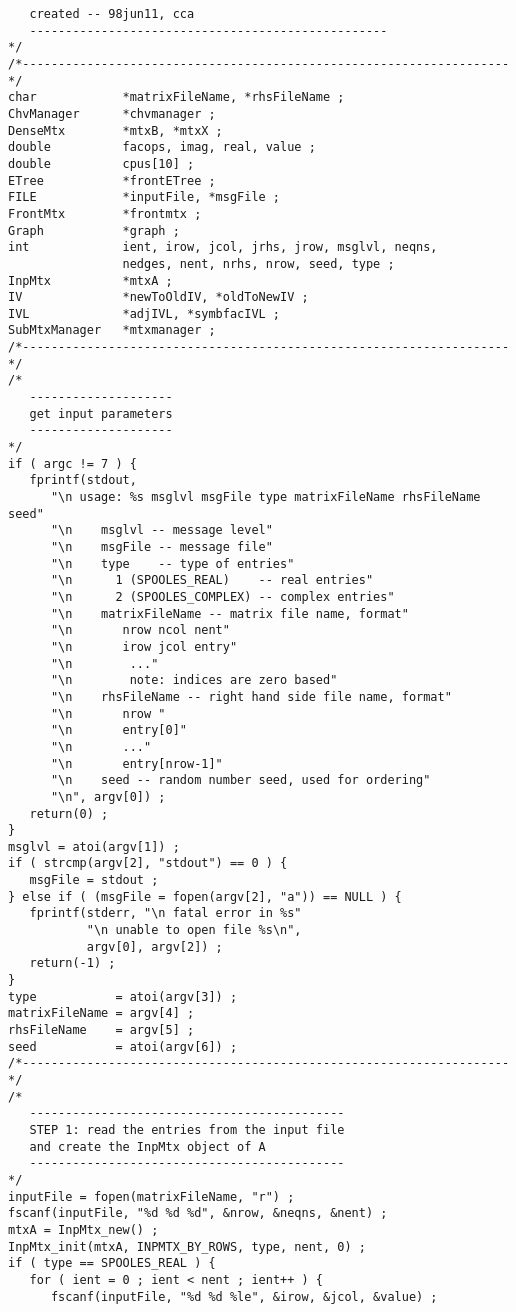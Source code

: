 \begin{verbatim}
   created -- 98jun11, cca
   --------------------------------------------------
*/
/*--------------------------------------------------------------------*/
char            *matrixFileName, *rhsFileName ;
ChvManager      *chvmanager ;
DenseMtx        *mtxB, *mtxX ;
double          facops, imag, real, value ;
double          cpus[10] ;
ETree           *frontETree ;
FILE            *inputFile, *msgFile ;
FrontMtx        *frontmtx ;
Graph           *graph ;
int             ient, irow, jcol, jrhs, jrow, msglvl, neqns,
                nedges, nent, nrhs, nrow, seed, type ;
InpMtx          *mtxA ;
IV              *newToOldIV, *oldToNewIV ;
IVL             *adjIVL, *symbfacIVL ;
SubMtxManager   *mtxmanager ;
/*--------------------------------------------------------------------*/
/*
   --------------------
   get input parameters
   --------------------
*/
if ( argc != 7 ) {
   fprintf(stdout, 
      "\n usage: %s msglvl msgFile type matrixFileName rhsFileName seed"
      "\n    msglvl -- message level"
      "\n    msgFile -- message file"
      "\n    type    -- type of entries"
      "\n      1 (SPOOLES_REAL)    -- real entries"
      "\n      2 (SPOOLES_COMPLEX) -- complex entries"
      "\n    matrixFileName -- matrix file name, format"
      "\n       nrow ncol nent"
      "\n       irow jcol entry"
      "\n        ..."
      "\n        note: indices are zero based"
      "\n    rhsFileName -- right hand side file name, format"
      "\n       nrow "
      "\n       entry[0]"
      "\n       ..."
      "\n       entry[nrow-1]"
      "\n    seed -- random number seed, used for ordering"
      "\n", argv[0]) ;
   return(0) ;
}
msglvl = atoi(argv[1]) ;
if ( strcmp(argv[2], "stdout") == 0 ) {
   msgFile = stdout ;
} else if ( (msgFile = fopen(argv[2], "a")) == NULL ) {
   fprintf(stderr, "\n fatal error in %s"
           "\n unable to open file %s\n",
           argv[0], argv[2]) ;
   return(-1) ;
}
type           = atoi(argv[3]) ;
matrixFileName = argv[4] ;
rhsFileName    = argv[5] ;
seed           = atoi(argv[6]) ;
/*--------------------------------------------------------------------*/
/*
   --------------------------------------------
   STEP 1: read the entries from the input file 
   and create the InpMtx object of A
   --------------------------------------------
*/
inputFile = fopen(matrixFileName, "r") ;
fscanf(inputFile, "%d %d %d", &nrow, &neqns, &nent) ;
mtxA = InpMtx_new() ;
InpMtx_init(mtxA, INPMTX_BY_ROWS, type, nent, 0) ;
if ( type == SPOOLES_REAL ) {
   for ( ient = 0 ; ient < nent ; ient++ ) {
      fscanf(inputFile, "%d %d %le", &irow, &jcol, &value) ;

\end{verbatim}
